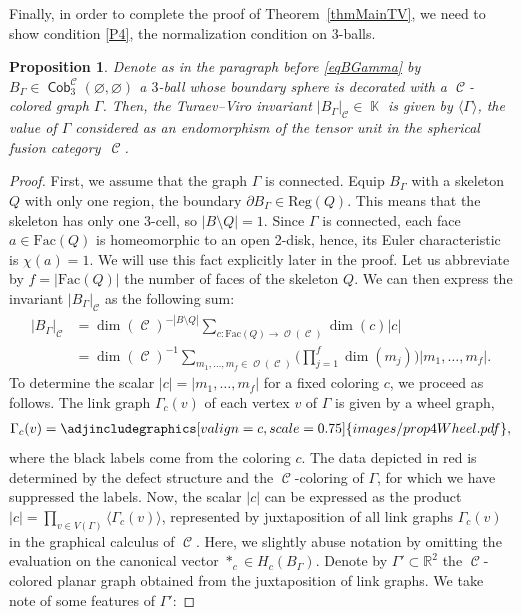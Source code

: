\documentclass[pdftex]{sigma}
\DeclareMathOperator{\K}{\mathbb{K}}
\DeclareMathOperator{\Cob}{\mathsf{Cob}}
\DeclareMathOperator{\calc}{\mathcal{C}}
\DeclareMathOperator{\calo}{\mathcal{O}}
\numberwithin{equation}{section}
\newtheorem{Proposition}[Proposition]{Proposition}
\theoremstyle{definition}
\begin{document}
Finally, in order to complete the proof of Theorem~\ref{thmMainTV}, we need to show condition \ref{P4}, the normalization condition on 3-balls.
\begin{Proposition} \label{propProp4TV}
Denote as in the paragraph before \eqref{eqBGamma} by $B_{\Gamma} \in \Cob_3^{\calc}(\varnothing, \varnothing)$ a $3$-ball whose boundary sphere is decorated with a $\calc$-colored graph $\Gamma$. Then, the Turaev--Viro invariant ${|B_{\Gamma}|_{\calc} \in \K}$ is given by $\langle \Gamma \rangle$, the value of $\Gamma$ considered as an endomorphism of the tensor unit in the spherical fusion category~$\calc$.
\end{Proposition}
\begin{proof}
 First, we assume that the graph $\Gamma$ is connected. Equip $B_{\Gamma}$ with a skeleton $Q$ with only one region, the boundary $\partial B_{\Gamma} \in \mathrm{Reg}(Q)$. This means that the skeleton has only one 3-cell, so $|B\setminus Q| = 1$. Since $\Gamma$ is connected, each face $a \in \mathrm{Fac}(Q)$ is homeomorphic to an open 2-disk, hence, its Euler characteristic is $\chi(a) = 1$. We will use this fact explicitly later in the proof. Let us abbreviate by $f = |\mathrm{Fac}(Q)|$ the number of faces of the skeleton $Q$. We can then express the invariant $|B_{\Gamma}|_{\calc}$ as the following sum:
 \begin{align}
 \label{eqInvBGamma}
 |B_{\Gamma}|_{\calc} &= \dim(\calc)^{-|B\setminus Q|}\sum_{c\colon \mathrm{Fac}(Q) \rightarrow \calo(\calc)} \dim(c) |c| \nonumber \\
 &= \dim(\calc)^{-1}\sum_{m_1, \dots, m_f \in \calo(\calc)} \biggl(\prod_{j = 1}^f \dim(m_j) \biggr) |m_1, \dots, m_f|.
 \end{align}
 To determine the scalar $|c| = |m_1, \dots, m_f|$ for a fixed coloring $c$, we proceed as follows. The link graph $\Gamma_c(v)$ of each vertex $v$ of $\Gamma$ is given by a wheel graph,
 \begin{align*}
 \Gamma_c(v) = \adjincludegraphics[valign=c, scale = 0.75]{images/prop4Wheel.pdf},
 \end{align*}
 where the black labels come from the coloring $c$. The data depicted in red is determined by the defect structure and the $\calc$-coloring of $\Gamma$, for which we have suppressed the labels. Now, the scalar $|c|$ can be expressed as the product $|c| = \prod_{v \in V(\Gamma)}\langle \Gamma_c(v) \rangle$, represented by juxtaposition of all link graphs $\Gamma_c(v)$ in the graphical calculus of $\calc$. Here, we slightly abuse notation by omitting the evaluation on the canonical vector $*_c \in H_c(B_{\Gamma})$. Denote by $\Gamma' \subset \mathbb{R}^2$ the $\calc$-colored planar graph obtained from the juxtaposition of link graphs. We take note of some features of $\Gamma'$:

\end{proof}
\end{document}
